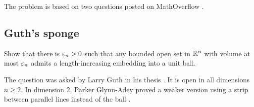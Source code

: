 The problem is based on two questions posted on MathOverflow \cite{rourke-optic, petrunin-optic}.

\subsection{Guth's sponge}

\begin{pr}
Show that there is $\varepsilon_n>0$ such that any bounded open set in $\mathbb{R}^n$ with volume at most $\varepsilon_n$ admits a length-increasing embedding into a unit ball.
\end{pr}

The question was asked by Larry Guth in his thesis \cite{guth-2005}.
It is open in all dimensions $n\ge 2$.
In dimension 2, Parker Glynn-Adey proved a weaker version using a strip between parallel lines instead of the ball \cite{glynn-adey}.
